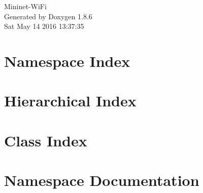 \documentclass[twoside]{book}
\newcommand{\clearemptydoublepage}{%
  \newpage{\pagestyle{empty}\cleardoublepage}%
}
\begin{document}
\hypersetup{pageanchor=false}
\begin{titlepage}
\vspace*{7cm}
\begin{center}%
{\Large Mininet-\/\-Wi\-Fi }\\
\vspace*{1cm}
{\large Generated by Doxygen 1.8.6}\\
\vspace*{0.5cm}
{\small Sat May 14 2016 13:37:35}\\
\end{center}
\end{titlepage}
\clearemptydoublepage
\tableofcontents
\clearemptydoublepage
{}
\hypersetup{pageanchor=true}

\chapter{Namespace Index}

\chapter{Hierarchical Index}

\chapter{Class Index}

\chapter{Namespace Documentation}


















\end{document}
